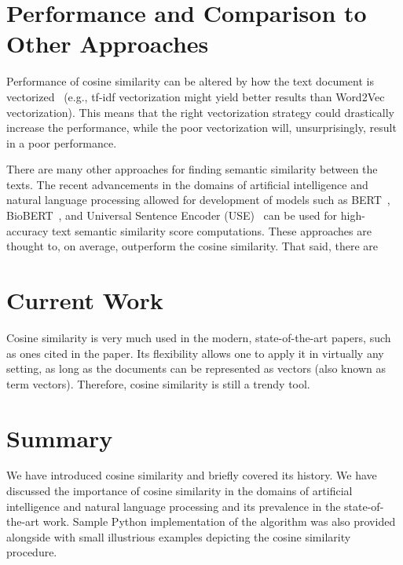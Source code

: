 \documentclass[11pt]{article}
\begin{document}
\section{Performance and Comparison to Other Approaches}

Performance of cosine similarity can be altered by how the text document is
vectorized~\cite{sitikhu2019} (e.g., tf-idf vectorization might yield better
results than Word2Vec vectorization). This means that the right vectorization
strategy could drastically increase the performance, while the poor
vectorization will, unsurprisingly, result in a poor performance.

\medskip

There are many other approaches for finding semantic similarity between the
texts. The recent advancements in the domains of artificial intelligence and
natural language processing allowed for development of models such as
BERT~\cite{turc2019}, BioBERT~\cite{btz682}, and Universal Sentence Encoder
(USE)~\cite{use} can be used for high-accuracy text semantic similarity score
computations. These approaches are thought to, on average, outperform the
cosine similarity. That said, there are


\section{Current Work}

Cosine similarity is very much used in the modern, state-of-the-art papers,
such as ones cited in the paper. Its flexibility allows one to apply it in
virtually any setting, as long as the documents can be represented as vectors
(also known as term vectors). Therefore, cosine similarity is still a trendy
tool.


\section{Summary}

We have introduced cosine similarity and briefly covered its history. We have
discussed the importance of cosine similarity in the domains of artificial
intelligence and natural language processing and its prevalence in the
state-of-the-art work. Sample Python implementation of the algorithm was also
provided alongside with small illustrious examples depicting the cosine
similarity procedure.


\printbibliography[heading=bibintoc]

\end{document}
